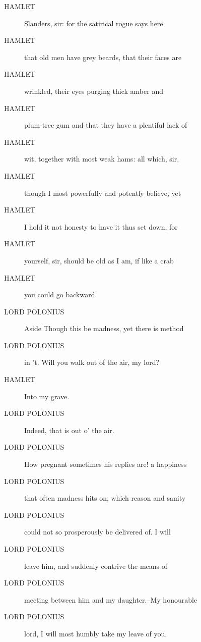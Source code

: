 \documentclass{article}
\begin{document}
\begin{description}
            
\item[HAMLET] Slanders, sir: for the satirical rogue says here
\item[HAMLET] that old men have grey beards, that their faces are
\item[HAMLET] wrinkled, their eyes purging thick amber and
\item[HAMLET] plum-tree gum and that they have a plentiful lack of
\item[HAMLET] wit, together with most weak hams: all which, sir,
\item[HAMLET] though I most powerfully and potently believe, yet
\item[HAMLET] I hold it not honesty to have it thus set down, for
\item[HAMLET] yourself, sir, should be old as I am, if like a crab
\item[HAMLET] you could go backward.
\end{description}
          
\begin{description}
            
\item[LORD POLONIUS] 
               Aside  Though this be madness, yet there is method
\item[LORD POLONIUS] in 't. Will you walk out of the air, my lord?
\end{description}
          
\begin{description}
            
\item[HAMLET] Into my grave.
\end{description}
          
\begin{description}
            
\item[LORD POLONIUS] Indeed, that is out o' the air.
\item[LORD POLONIUS] How pregnant sometimes his replies are! a happiness
\item[LORD POLONIUS] that often madness hits on, which reason and sanity
\item[LORD POLONIUS] could not so prosperously be delivered of. I will
\item[LORD POLONIUS] leave him, and suddenly contrive the means of
\item[LORD POLONIUS] meeting between him and my daughter.--My honourable
\item[LORD POLONIUS] lord, I will most humbly take my leave of you.
\end{description}
          
\end{document}
